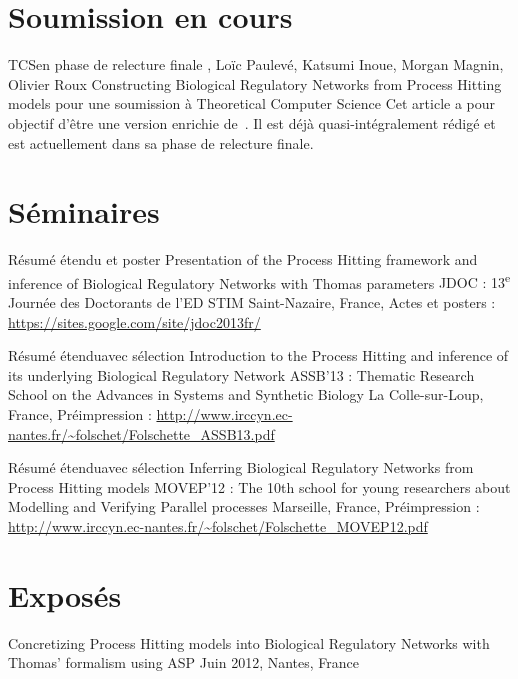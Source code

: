 \section{Soumission en cours}
\label{sec:encours}

\publi
{TCS}{en phase de relecture finale}
{, Loïc Paulevé, Katsumi Inoue, Morgan Magnin, Olivier Roux}
{Constructing Biological Regulatory Networks from Process Hitting models}
{pour une soumission à }{Theoretical Computer Science}{}
{Cet article a pour objectif d'être une version enrichie de~\cite{FPIMR12-CMSB}.
Il est déjà quasi-intégralement rédigé et est actuellement dans sa phase de relecture finale.}



\section{Séminaires}

\publi
{Résumé étendu et poster}{}
{}
{Presentation of the Process Hitting framework and inference of Biological Regulatory Networks with Thomas parameters}
{}{JDOC : 13\textsuperscript{e} Journée des Doctorants de l'ED STIM}
{Saint-Nazaire, France, }
{Actes et posters : \url{https://sites.google.com/site/jdoc2013fr/}}

\publi
{Résumé étendu}{avec sélection}
{}
{Introduction to the Process Hitting and inference of its underlying Biological Regulatory Network}
{}{ASSB'13 : Thematic Research School on the Advances in Systems and Synthetic Biology}
{La Colle-sur-Loup, France, }
{Préimpression : \url{http://www.irccyn.ec-nantes.fr/~folschet/Folschette_ASSB13.pdf}}

\publi
{Résumé étendu}{avec sélection}
{}
{Inferring Biological Regulatory Networks from Process Hitting models}
{}{MOVEP'12 : The 10th school for young researchers about Modelling and Verifying Parallel processes}
{Marseille, France, }
{Préimpression : \url{http://www.irccyn.ec-nantes.fr/~folschet/Folschette_MOVEP12.pdf}}



\section{Exposés}

{Concretizing Process Hitting models into Biological Regulatory Networks with Thomas' formalism using ASP}
{Juin 2012, Nantes, France}

